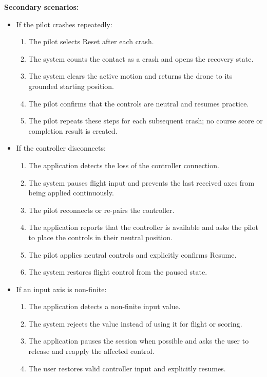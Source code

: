 \documentclass[12pt]{article}
\begin{document}
\begin{description}
\textbf{Secondary scenarios:}
\begin{itemize}
\item If the pilot crashes repeatedly:
\begin{enumerate}
\item The pilot selects Reset after each crash.
\item The system counts the contact as a crash and opens the recovery state.
\item The system clears the active motion and returns the drone to its grounded
starting position.
\item The pilot confirms that the controls are neutral and resumes practice.
\item The pilot repeats these steps for each subsequent crash; no course score
or completion result is created.
\end{enumerate}
\item If the controller disconnects:
\begin{enumerate}
\item The application detects the loss of the controller connection.
\item The system pauses flight input and prevents the last received axes from being
applied continuously.
\item The pilot reconnects or re-pairs the controller.
\item The application reports that the controller is available and asks the pilot to
place the controls in their neutral position.
\item The pilot applies neutral controls and explicitly confirms Resume.
\item The system restores flight control from the paused state.
\end{enumerate}
\item If an input axis is non-finite:
\begin{enumerate}
\item The application detects a non-finite input value.
\item The system rejects the value instead of using it for flight or scoring.
\item The application pauses the session when possible and asks the user to release and
reapply the affected control.
\item The user restores valid controller input and explicitly resumes.
\end{enumerate}
\end{itemize}

\item[U-02: Running an Obstacle-Course Level]\mbox{}


\end{description}
\end{document}
